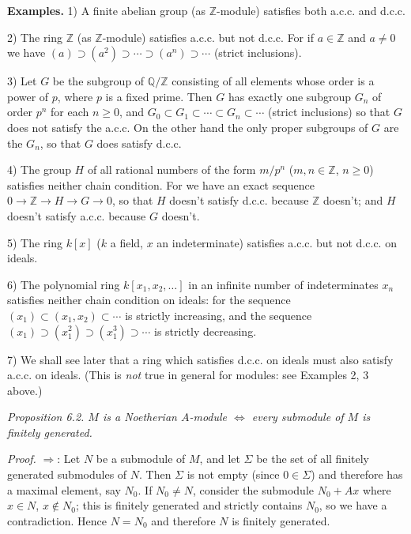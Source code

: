 \noindent\textbf{Examples.} 1) A finite abelian group (as $\mathbb Z$-module) satisfies both a.c.c. and d.c.c.

2) The ring $\mathbb Z$ (as $\mathbb Z$-module) satisfies a.c.c. but not d.c.c. For if $a\in\mathbb Z$ and $a\neq0$ we have $(a)\supset(a^2)\supset\cdots\supset(a^n)\supset\cdots$ (strict inclusions).

3) Let $G$ be the subgroup of $\mathbb Q/\mathbb Z$ consisting of all elements whose order is a power of $p$, where $p$ is a fixed prime. Then $G$ has exactly one subgroup $G_n$ of order $p^n$ for each $n\geq0$, and $G_0\subset G_1\subset\cdots\subset G_n\subset\cdots$ (strict inclusions) so that $G$ does not satisfy the a.c.c. On the other hand the only proper subgroups of $G$ are the $G_n$, so that $G$ does satisfy d.c.c.

4) The group $H$ of all rational numbers of the form $m/p^n$ ($m,n\in\mathbb Z$, $n\geq0$) satisfies neither chain condition. For we have an exact sequence $0\longrightarrow\mathbb Z\longrightarrow H\longrightarrow G\longrightarrow0$, so that $H$ doesn't satisfy d.c.c. because $\mathbb Z$ doesn't; and $H$ doesn't satisfy a.c.c. because $G$ doesn't.

5) The ring $k[x]$ ($k$ a field, $x$ an indeterminate) satisfies a.c.c. but not d.c.c. on ideals.

6) The polynomial ring $k[x_1,x_2,\ldots]$ in an infinite number of indeterminates $x_n$ satisfies neither chain condition on ideals: for the sequence $(x_1)\subset(x_1,x_2)\subset\cdots$ is strictly increasing, and the sequence $(x_1)\supset(x_1^2)\supset(x_1^3)\supset\cdots$ is strictly decreasing.

7) We shall see later that a ring which satisfies d.c.c. on ideals must also satisfy a.c.c. on ideals. (This is \textit{not} true in general for modules: see Examples 2, 3 above.)

\noindent\textit{Proposition 6.2. $M$ is a Noetherian $A$-module $\Longleftrightarrow$ every submodule of $M$ is finitely generated.}

\noindent\textit{Proof.} $\Rightarrow$: Let $N$ be a submodule of $M$, and let $\Sigma$ be the set of all finitely generated submodules of $N$. Then $\Sigma$ is not empty (since $0\in\Sigma$) and therefore has a maximal element, say $N_0$. If $N_0\neq N$, consider the submodule $N_0+Ax$ where $x\in N$, $x\notin N_0$; this is finitely generated and strictly contains $N_0$, so we have a contradiction. Hence $N=N_0$ and therefore $N$ is finitely generated.

